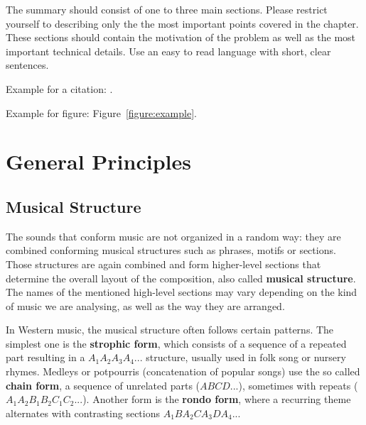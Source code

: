 \documentclass[a4paper, 9pt, twocolumn]{extarticle}
\begin{document}
The summary should consist of one to three main sections.
Please restrict yourself to describing only the the most
important points covered in the chapter. These sections
should contain the motivation of the problem as well as
the most important technical details. Use an easy to read
language with short, clear sentences. 


Example for a citation: \cite{Mueller07_InformationRetrieval_SPRINGER}.

Example for figure: Figure~\ref{figure:example}.


\newpage

\section{General Principles} 
\label{section:generalPrinciples}

\subsection{Musical Structure}  
The sounds that conform music are not organized in a random way: they are combined conforming musical structures such as phrases, motifs or sections. Those structures are again combined and form higher-level sections that determine the overall layout of the composition, also called \textbf{musical structure}. The names of the mentioned high-level sections may vary depending on the kind of music we are analysing, as well as the way they are arranged. 

\medskip

In Western music, the musical structure often follows certain patterns. The simplest one is the \textbf{strophic form}, which consists of a sequence of a repeated part resulting in a $A_{1}A_{2}A_{3}A_{4}...$ structure, usually used in folk song or nursery rhymes. Medleys or potpourris (concatenation of popular songs) use the so called \textbf{chain form}, a sequence of unrelated parts ($ABCD...$), sometimes with repeats ($A_{1}A_{2}B_{1}B_{2}C_{1}C_{2}...$). Another form is the \textbf{rondo form}, where a recurring theme alternates with contrasting sections $A_{1}BA_{2}CA_{3}DA_{4}...$
\end{document}
